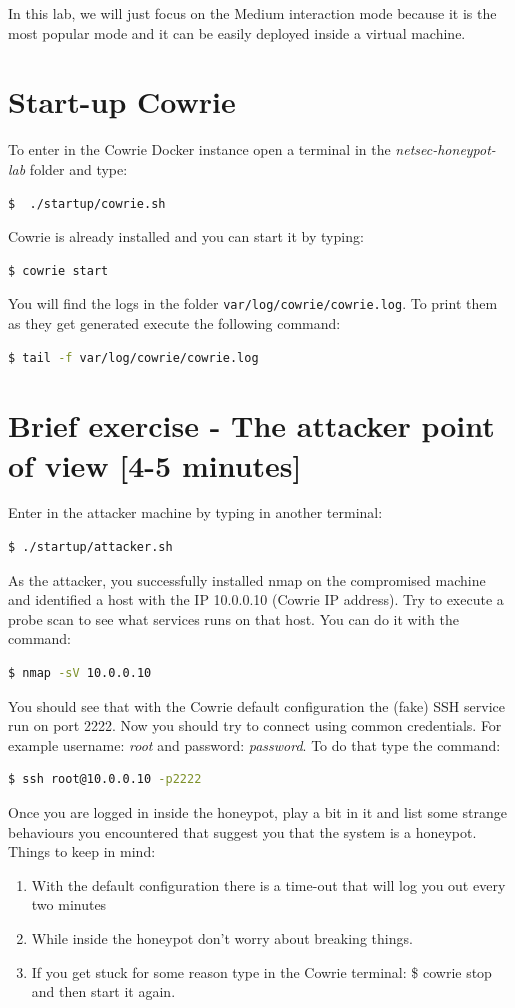 \documentclass[epsfig,a4paper,11pt,titlepage,oneside,openany]{book}
\begin{document}
\begin{itemize}
\noindent In this lab, we will just focus on the Medium interaction mode because it is the most popular mode and it can be easily deployed inside a virtual machine.


\section{Start-up Cowrie}
To enter in the Cowrie Docker instance open a terminal in the \textit{netsec-honeypot-lab} folder and type:
\begin{lstlisting}[language=bash]
$  ./startup/cowrie.sh
\end{lstlisting}
Cowrie is already installed and you can start it by typing:
\begin{lstlisting}[language=bash]
$ cowrie start
\end{lstlisting}
You will find the logs in the folder \texttt{var/log/cowrie/cowrie.log}. To print them as they get generated execute the following command:
\begin{lstlisting}[language=bash]
$ tail -f var/log/cowrie/cowrie.log
\end{lstlisting}

\section{Brief exercise - The attacker point of view [4-5 minutes]}
Enter in the attacker machine by typing in another terminal:
\begin{lstlisting}[language=bash]
$ ./startup/attacker.sh
\end{lstlisting}
As the attacker, you successfully installed nmap on the compromised machine and identified a host with the IP 10.0.0.10 (Cowrie IP address). Try to execute a probe scan to see what services runs on that host. You can do it with the command:
\begin{lstlisting}[language=bash]
$ nmap -sV 10.0.0.10
\end{lstlisting}
You should see that with the Cowrie default configuration the (fake) SSH service run on port 2222.
Now you should try to connect using common credentials. For example username: \textit{root} and password: \textit{password}. To do that type the command:
\begin{lstlisting}[language=bash]
$ ssh root@10.0.0.10 -p2222
\end{lstlisting}
Once you are logged in inside the honeypot, play a bit in it and list some strange behaviours you encountered that suggest you that the system is a honeypot.
Things to keep in mind:
\begin{enumerate}
\itemsep0em
\item With the default configuration there is a time-out that will log you out every two minutes
\item While inside the honeypot don't worry about breaking things.
\item If you get stuck for some reason type in the Cowrie terminal: \$ cowrie stop and then start it again.
\end{enumerate}


\end{itemize}
\end{document}
